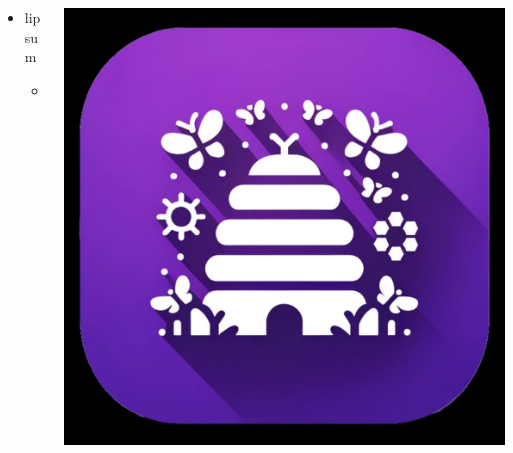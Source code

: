 \documentclass[aspectratio=169]{beamer}
\begin{document}
\begin{frame}{4}

\begin{columns}[T]
    \begin{column}[T]{0.5\textwidth}
        \begin{itemize}
            \item lipsum
            \begin{itemize}
                \item example
            \end{itemize}
        \end{itemize}
    \end{column}
    
    \begin{column}{0.5\textwidth}
        \includegraphics[height=0.8\textheight]{imgs/app_icons/2.png}
    \end{column}
\end{columns}

\end{frame}
\end{document}

